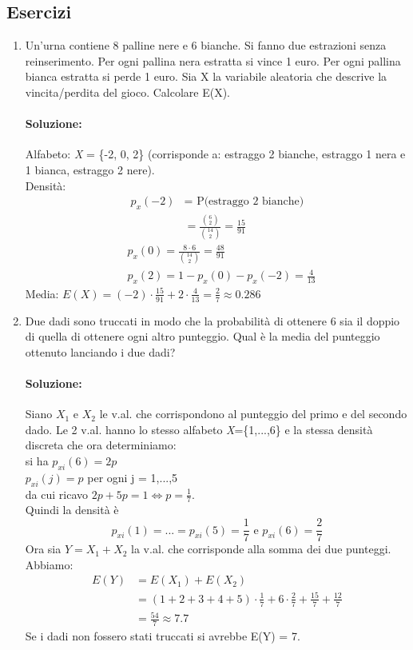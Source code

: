 \documentclass{report}
\begin{document}
\subsection{Esercizi}
\begin{enumerate}
    \item Un'urna contiene 8 palline nere e 6 bianche. Si fanno due estrazioni senza reinserimento. Per ogni pallina nera estratta si vince 1 euro. Per ogni pallina bianca estratta si perde 1 euro. Sia X la variabile aleatoria che descrive la vincita/perdita del gioco. Calcolare E(X).
    \paragraph{Soluzione:} Alfabeto: \textit{X} = \{-2, 0, 2\} (corrisponde a: estraggo 2 bianche, estraggo 1 nera e 1 bianca, estraggo 2 nere).\\
    Densità: 
    \begin{align}
      p_x(-2) & = \text{ P(estraggo 2 bianche)}\\
      & = \frac{\binom{6}{2}}{\binom{14}{2}} = \frac{15}{91}
      \end{align}
      \begin{align}
      & p_x(0) = \frac{8\cdot 6}{\binom{14}{2}} = \frac{48}{91}\\
      & p_x(2) = 1 - p_x(0) - p_x(-2) = \frac{4}{13}
      \end{align}
    Media: \(E(X) = (-2) \cdot \frac{15}{91} + 2\cdot \frac{4}{13} = \frac{2}{7} \approx 0.286\)
    \item Due dadi sono truccati in modo che la probabilità di ottenere 6 sia il doppio di quella di ottenere ogni altro punteggio. Qual è la media del punteggio ottenuto lanciando i due dadi?
    \paragraph{Soluzione:} Siano \(X_1 \text{ e } X_2\) le v.al. che corrispondono al punteggio del primo e del secondo dado. Le 2 v.al. hanno lo stesso alfabeto \textit{X}=\{1,...,6\} e la stessa densità discreta che ora determiniamo:\\
    si ha \(p_{xi}(6) = 2p\)\\
    \(p_{xi}(j) = p\) per ogni j = 1,...,5\\
    da cui ricavo \(2p+5p = 1 \Longleftrightarrow p = \frac{1}{7}\).\\
    Quindi la densità è \[p_{xi}(1) = ... = p_{xi} (5) = \frac{1}{7} \text{ e } p_{xi}(6) = \frac{2}{7}\]
    Ora sia \(Y = X_1 + X_2\) la v.al. che corrisponde alla somma dei due punteggi. Abbiamo:
    \begin{align}
        E(Y) & = E(X_1) + E(X_2) \\
        & = (1 + 2 + 3 + 4 + 5) \cdot \frac{1}{7} + 6 \cdot \frac{2}{7} + \frac{15}{7} + \frac{12}{7}\\
        & = \frac{54}{7} \approx 7.7
    \end{align}
    Se i dadi non fossero stati truccati si avrebbe E(Y) = 7.
\end{enumerate}
\end{document}
